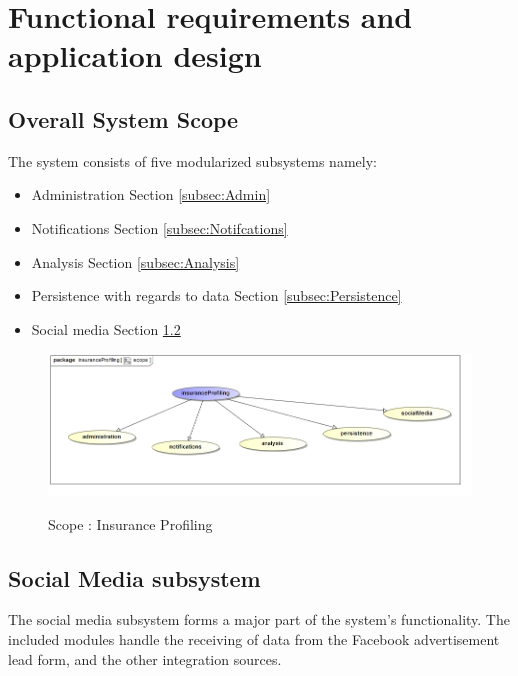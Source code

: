 \documentclass{article}
\begin{document}
	\pagebreak

\section{Functional requirements and application design}
	\subsection{Overall System Scope}
	The system consists of five modularized subsystems namely:
	\begin{itemize}
		\item Administration Section \ref{subsec:Admin}
		\item Notifications Section \ref{subsec:Notifcations}
		\item Analysis Section \ref{subsec:Analysis}
		\item Persistence with regards to data Section \ref{subsec:Persistence}
		\item Social media Section \ref{subsec:SocialMedia}
	\end{itemize}
		\begin{figure}[H]
		\includegraphics[width=\textwidth]{images/uc__insuranceProfiling__scope.jpg}  \\
		\caption{Scope : Insurance Profiling}
		\end{figure}
		
		
		\pagebreak
	\subsection{Social Media subsystem}\label{subsec:SocialMedia}
	The social media subsystem forms a major part of the system's functionality. The included modules handle the receiving of data from the Facebook advertisement lead form, and the other integration sources.
\end{document}
